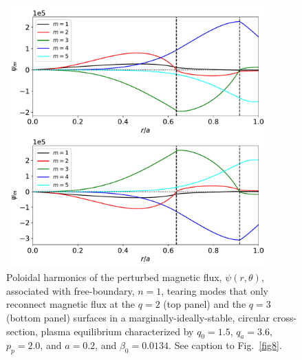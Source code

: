 \documentclass[12pt,prb,aps]{revtex4-1}
\begin{document}
\begin{figure}
\centerline{\includegraphics[width=0.9\textwidth]{Fig10.pdf}}
\caption{Poloidal harmonics of the perturbed magnetic flux, $\psi(r,\theta)$,  associated with free-boundary, $n=1$, tearing modes that only reconnect magnetic flux at the $q=2$  (top panel) and the $q=3$ (bottom panel) surfaces in a marginally-ideally-stable, 
circular cross-section, plasma equilibrium characterized by $q_0=1.5$, $q_a= 3.6$, $p_p=2.0$, and
$a=0.2$, and  $\beta_0=0.0134$. See caption to Fig.~\ref{fig8}.\label{fig10}}
\end{figure}
\end{document}
